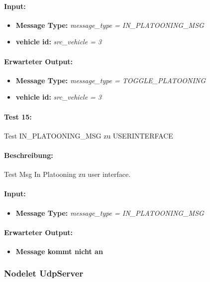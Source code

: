 \documentclass[a4paper, 12pt, titlepage]{scrartcl}
\begin{document}
{			\paragraph{Input:}
			\begin{itemize} \itemsep-0.5em
				\item \textbf{Message Type:} \emph{message\_type = IN\_PLATOONING\_MSG}
				\item \textbf{vehicle id:} \emph{src\_vehicle = 3}
			\end{itemize}
			\paragraph{Erwarteter Output:}
			\begin{itemize} \itemsep-0.5em
				\item \textbf{Message Type:} \emph{message\_type = TOGGLE\_PLATOONING}
				\item \textbf{vehicle id:} \emph{src\_vehicle = 3}
			\end{itemize}

			\paragraph{Test 15:}{Test IN\_PLATOONING\_MSG zu USERINTERFACE}
			\paragraph{Beschreibung:} Test Msg In Platooning zu user interface.
			\paragraph{Input:}
			\begin{itemize} \itemsep-0.5em
				\item \textbf{Message Type:} \emph{message\_type = IN\_PLATOONING\_MSG}
			\end{itemize}
			\paragraph{Erwarteter Output:}
			\begin{itemize} \itemsep-0.5em
				\item \textbf{Message kommt nicht an}
			\end{itemize}

			\subsubsection{Nodelet UdpServer}
			\label{node_upd_server}
}
\end{document}
